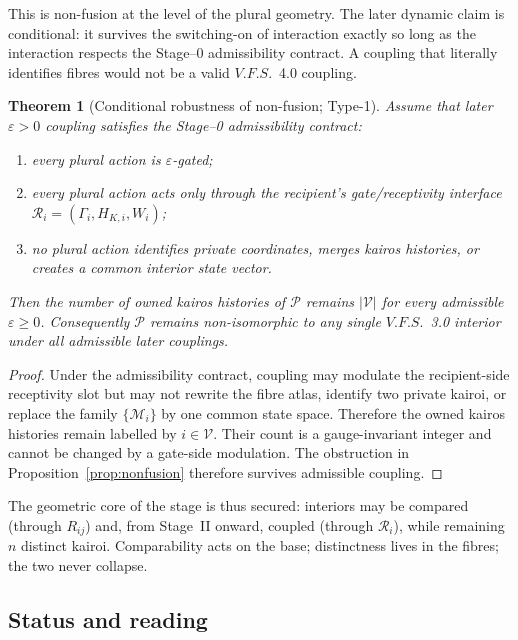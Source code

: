 \documentclass[11pt,a4paper]{article}
\def\mathrm#1{#1}%
\newcommand{\VFS}{\ensuremath{\mathrm{V.F.S.}}}
\theoremstyle{definition}
\theoremstyle{plain}
\newtheorem{theorem}[definition]{Theorem}
\theoremstyle{remark}
\begin{document}
This is non-fusion at the level of the plural geometry. The later dynamic claim is
conditional: it survives the switching-on of interaction exactly so long as the
interaction respects the Stage--0 admissibility contract. A coupling that literally
identifies fibres would not be a valid \VFS\ 4.0 coupling.

\begin{theorem}[Conditional robustness of non-fusion; Type-1]\label{thm:robust}
Assume that later \(\varepsilon>0\) coupling satisfies the Stage--0 admissibility
contract:
\begin{enumerate}[label=\textup{(\roman*)},leftmargin=1.2cm]
\item every plural action is \(\varepsilon\)-gated;
\item every plural action acts only through the recipient's gate/receptivity
interface \(\mathcal R_i=(\Gamma_i,H_{K,i},W_i)\);
\item no plural action identifies private coordinates, merges kairos histories, or
creates a common interior state vector.
\end{enumerate}
Then the number of owned kairos histories of \(\mathcal P\) remains
\(|\mathcal V|\) for every admissible \(\varepsilon\ge0\). Consequently
\(\mathcal P\) remains non-isomorphic to any single \VFS\ 3.0 interior under all
admissible later couplings.
\end{theorem}

\begin{proof}
Under the admissibility contract, coupling may modulate the recipient-side
receptivity slot but may not rewrite the fibre atlas, identify two private kairoi,
or replace the family \(\{\mathcal M_i\}\) by one common state space. Therefore the
owned kairos histories remain labelled by \(i\in\mathcal V\). Their count is a
gauge-invariant integer and cannot be changed by a gate-side modulation. The
obstruction in Proposition~\ref{prop:nonfusion} therefore survives admissible
coupling. \qedhere
\end{proof}

\noindent The geometric core of the stage is thus secured: interiors may be compared
(through \(R_{ij}\)) and, from Stage~II onward, coupled (through \(\mathcal R_i\)), while
remaining \(n\) distinct kairoi. Comparability acts on the base; distinctness lives in the
fibres; the two never collapse.

\subsection{Status and reading}
\end{document}
